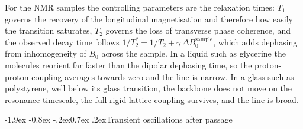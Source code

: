 \documentclass[11pt,a4paper]{article}
\makeatletter
\renewcommand\subsection{\@startsection{subsection}{2}{\z@}%
  {-1.9ex \@plus -0.8ex \@minus -.2ex}{0.7ex \@plus .2ex}{\normalfont\normalsize\bfseries}}
\makeatother
\begin{document}
For the NMR samples the controlling parameters are the relaxation times: $T_1$ governs the recovery
of the longitudinal magnetisation and therefore how easily the transition saturates, $T_2$ governs
the loss of transverse phase coherence, and the observed decay time follows
$1/T_2^{*} = 1/T_2 + \gamma\,\Delta B_0^{\mathrm{sample}}$, which adds dephasing from
inhomogeneity of $B_0$ across the sample. In a liquid such as glycerine the molecules reorient far
faster than the dipolar dephasing time, so the proton-proton coupling averages towards zero and the
line is narrow. In a glass such as polystyrene, well below its glass transition, the backbone does
not move on the resonance timescale, the full rigid-lattice coupling survives, and the line is
broad.

\subsection{Transient oscillations after passage}
\label{sec:theorywiggles}
\end{document}
